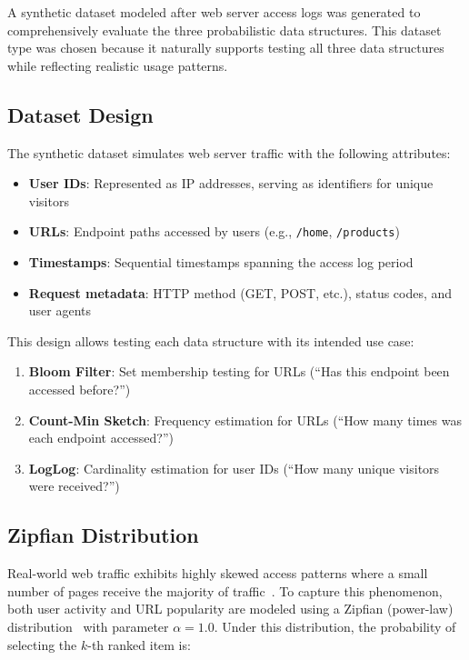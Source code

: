 A synthetic dataset modeled after web server access logs was generated to comprehensively evaluate the three probabilistic data structures. This dataset type was chosen because it naturally supports testing all three data structures while reflecting realistic usage patterns.

\subsection{Dataset Design}

The synthetic dataset simulates web server traffic with the following attributes:

\begin{itemize}
    \item \textbf{User IDs}: Represented as IP addresses, serving as identifiers for unique visitors
    \item \textbf{URLs}: Endpoint paths accessed by users (e.g., \texttt{/home}, \texttt{/products})
    \item \textbf{Timestamps}: Sequential timestamps spanning the access log period
    \item \textbf{Request metadata}: HTTP method (GET, POST, etc.), status codes, and user agents
\end{itemize}

This design allows testing each data structure with its intended use case:

\begin{enumerate}
    \item \textbf{Bloom Filter}: Set membership testing for URLs (``Has this endpoint been accessed before?'')
    \item \textbf{Count-Min Sketch}: Frequency estimation for URLs (``How many times was each endpoint accessed?'')
    \item \textbf{LogLog}: Cardinality estimation for user IDs (``How many unique visitors were received?'')
\end{enumerate}

\subsection{Zipfian Distribution}

Real-world web traffic exhibits highly skewed access patterns where a small number of pages receive the majority of traffic~\cite{broder2004network,breslau1999web}. To capture this phenomenon, both user activity and URL popularity are modeled using a Zipfian (power-law) distribution~\cite{breslau1999web} with parameter $\alpha = 1.0$. Under this distribution, the probability of selecting the $k$-th ranked item is:

